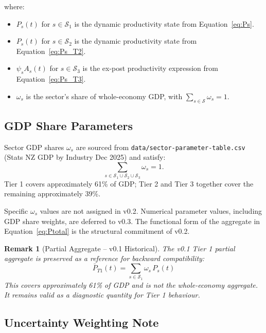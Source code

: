 \documentclass[11pt,a4paper]{article}
\newtheorem{remark}{Remark}
\begin{document}
where:
\begin{itemize}
  \item $P_s(t)$ for $s \in \mathcal{S}_1$ is the dynamic productivity state from Equation~\eqref{eq:Ps}.
  \item $P_s(t)$ for $s \in \mathcal{S}_2$ is the dynamic productivity state from Equation~\eqref{eq:Ps_T2}.
  \item $\psi_s A_s(t)$ for $s \in \mathcal{S}_3$ is the ex-post productivity expression from Equation~\eqref{eq:Ps_T3}.
  \item $\omega_s$ is the sector's share of whole-economy GDP, with $\sum_{s \in \mathcal{S}} \omega_s = 1$.
\end{itemize}

\subsection{GDP Share Parameters}

Sector GDP shares $\omega_s$ are sourced from \texttt{data/sector-parameter-table.csv} (Stats NZ GDP by Industry Dec 2025) and satisfy:
\[
\sum_{s \in \mathcal{S}_1 \cup \mathcal{S}_2 \cup \mathcal{S}_3} \omega_s = 1.
\]
Tier 1 covers approximately 61\% of GDP; Tier 2 and Tier 3 together cover the remaining approximately 39\%.

Specific $\omega_s$ values are not assigned in v0.2. Numerical parameter values, including GDP share weights, are deferred to v0.3. The functional form of the aggregate in Equation~\eqref{eq:Ptotal} is the structural commitment of v0.2.

\begin{remark}[Partial Aggregate -- v0.1 Historical]
The v0.1 Tier 1 partial aggregate is preserved as a reference for backward compatibility:
\begin{equation}
\bar{P}_{T1}(t) = \sum_{s \in \mathcal{S}_1} \omega_s\, P_s(t)
\label{eq:Pt1}
\end{equation}
This covers approximately 61\% of GDP and is not the whole-economy aggregate. It remains valid as a diagnostic quantity for Tier 1 behaviour.
\end{remark}

\subsection{Uncertainty Weighting Note}
\end{document}
